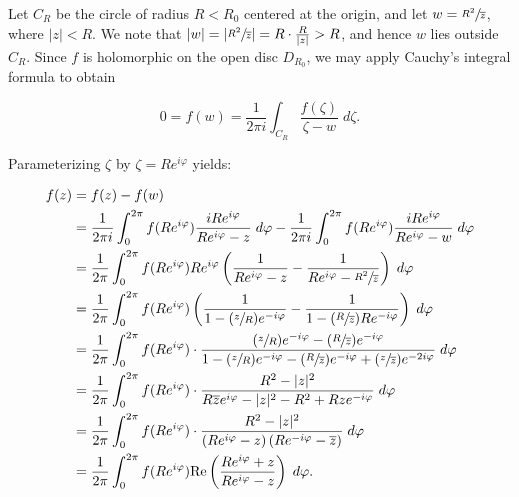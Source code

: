 \begin{solution}
  Let $C_R$ be the circle of radius $R < R_0$ centered at the origin, and let $w = \sfrac{R^2}{\overline{z}}$, where 
  $|z| < R$. We note that $|w| = \left| \sfrac{R^2}{\overline{z}} \right| = R \cdot \frac{R}{|z|} > R$, and hence $w$ lies 
  outside $C_R$. Since $f$ is holomorphic on the open disc $D_{R_0}$, we may apply Cauchy's integral formula to obtain
  
  $$
  0 = f(w) = \frac{1}{2 \pi i} \int_{C_R} \frac{f(\zeta)}{\zeta - w} \; d\zeta.
  $$
  
  Parameterizing $\zeta$ by $\zeta = R e^{i \varphi}$ yields:
  
  \begin{align*}
    f(z) &= f(z) - f(w) \\
         &= \frac{1}{2 \pi i} \int_0^{2 \pi} f(Re^{i \varphi}) \frac{iRe^{i\varphi}}{Re^{i \varphi} - z} \; d\varphi - \frac{1}{2 \pi i} \int_0^{2 \pi} f(R e^{i \varphi}) \frac{iRe^{i\varphi}}{Re^{i \varphi} - w} \; d\varphi \\
         &= \frac{1}{2 \pi} \int_0^{2 \pi} f(Re^{i \varphi}) Re^{i\varphi} \left( 
              \frac{1}{Re^{i \varphi} - z} - \frac{1}{Re^{i\varphi} - \sfrac{R^2}{\overline{z}}} 
            \right) \; d\varphi \\
         &= \frac{1}{2 \pi} \int_0^{2 \pi} f(Re^{i \varphi}) \left( 
              \frac{1}{1 - (\sfrac{z}{R}) e^{-i\varphi}} - \frac{1}{1 - (\sfrac{R}{\overline{z}})Re^{-i\varphi}} 
            \right) \; d\varphi \\
         &= \frac{1}{2 \pi} \int_0^{2 \pi} f(Re^{i \varphi}) \cdot
              \frac{(\sfrac{z}{R}) e^{-i\varphi} - (\sfrac{R}{\overline{z}})e^{-i\varphi}}
              {1 - (\sfrac{z}{R}) e^{-i\varphi} - (\sfrac{R}{\overline{z}}) e^{-i\varphi} + (\sfrac{z}{\overline{z}}) e^{-2i\varphi}} 
            \; d\varphi \\
         &= \frac{1}{2 \pi} \int_0^{2 \pi} f(Re^{i \varphi}) \cdot
              \frac{R^2 - |z|^2}
              {R \overline{z} e^{i\varphi} - |z|^2 - R^2 + R z e^{-i\varphi}}
            \; d\varphi \\
         &= \frac{1}{2 \pi} \int_0^{2 \pi} f(Re^{i \varphi}) \cdot
              \frac{R^2 - |z|^2}
              {\left( Re^{i\varphi} - z \right)\left(R e^{-i\varphi} - \overline{z} \right)}
            \; d\varphi \\
         &= \frac{1}{2 \pi} \int_0^{2 \pi} f(Re^{i \varphi}) 
            \text{Re} \left( \frac{Re^{i \varphi} + z}{Re^{i \varphi} - z} \right) \; d\varphi.
  \end{align*}
\end{solution}